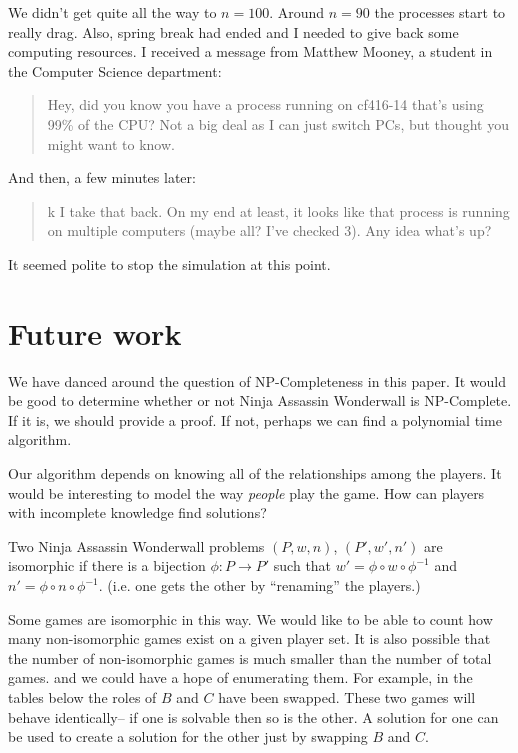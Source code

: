 \documentclass[12pt,x11names, rgb]{article}
\begin{document}
    We didn't get quite all the way to $n=100$. Around $n=90$ the processes start to really drag. Also, spring break had ended and I needed to give back some computing resources. I received a message from Matthew Mooney, a student in the Computer Science department:
    \begin{quote}
    Hey, did you know you have a process running on cf416-14 that's using 99\% of the CPU? Not a big deal as I can just switch PCs, but thought you might want to know.
    \end{quote}
    And then, a few minutes later:
    \begin{quote}
    k I take that back. On my end at least, it looks like that process is running on multiple computers (maybe all? I've checked 3). Any idea what's up?
    \end{quote}

    It seemed polite to stop the simulation at this point.

\section{Future work}
    \label{sec:future-work}
    We have danced around the question of NP-Completeness in this paper. It would be good to determine whether or not Ninja Assassin Wonderwall is NP-Complete. If it is, we should provide a proof. If not, perhaps we can find a polynomial time algorithm.

    Our algorithm depends on knowing all of the relationships among the players. It would be interesting to model the way \emph{people} play the game. How can players with incomplete knowledge find solutions?

 Two Ninja Assassin Wonderwall problems $(P,w,n)$, $(P', w', n')$ are isomorphic if there is a bijection $\phi: P\to P'$ such that $w'=\phi\circ w\circ \phi^{-1}$ and $n'=\phi\circ n\circ \phi^{-1}$.  (i.e. one gets the other by ``renaming'' the players.)

    Some games are isomorphic in this way. We would like to be able to count how many non-isomorphic games exist on a given player set. It is also possible that the number of non-isomorphic games is much smaller than the number of total games. and we could have a hope of enumerating them. For example, in the tables below the roles of $B$ and $C$ have been swapped. These two games will behave identically-- if one is solvable then so is the other. A solution for one can be used to create a solution for the other just by swapping $B$ and $C$.
\end{document}
